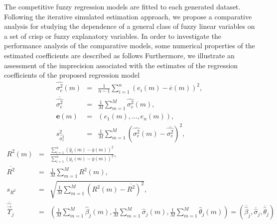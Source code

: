 \documentclass{IJFS}
\begin{document}
The competitive fuzzy regression models are fitted to each generated dataset.
Following the iterative simulated estimation approach,
we propose a comparative analysis for studying the dependence of a general class of fuzzy linear variables on a set of crisp or fuzzy explanatory variables.
In order to investigate
the performance analysis of the comparative models, some
numerical properties of the estimated coefficients are described as follows
Furthermore, we illustrate an assessment of the imprecision associated with the estimates of the regression coefficients of the proposed regression model
\begin{eqnarray*}
\widehat{\sigma^2_e}(m) &=&\frac{1}{n-1}\sum_{i=1}^{n}(e_i(m)-\overline{e}(m))^2, \\
\overline{\widehat{\sigma^2_e}}&=&\frac{1}{M} \sum_{m=1}^M  \widehat{\sigma^2_e}(m),\\
\boldsymbol{e}(m)&=&(e_1(m),\ldots,e_n(m)),\\
s^2_{\widehat{\sigma^2_e}}&=&\frac{1}{M} \sum_{m=1}^M (\widehat{\sigma^2_e}(m)-\overline{\widehat{\sigma^2_e}})^2,
\end{eqnarray*}
\begin{eqnarray*}
R^2(m)&=&\frac{\sum_{i=1}^{n}(\widehat{y}_i(m)-\overline{y}(m))^2}{\sum_{i=1}^{n}(y_i(m)-\overline{y}(m))^2}, \\
\overline{R^2}&=&\frac{1}{M} \sum_{m=1}^M  R^2(m),\\
s_{R^2}  &=&\sqrt{\frac{1}{M} \sum_{m=1}^M  \left(R^2(m)-\overline{R^2}\right)^2},\\
\overline{\widehat{\vec{\Upsilon}}}_j &=&\left(\frac{1}{M}\sum_{m=1}^M\widehat{\beta}_j(m),\frac{1}{M}\sum_{m=1}^M\widehat{\sigma}_j(m),\frac{1}{M}\sum_{m=1}^M\widehat{\theta}_j(m)\right)
=\left(\overline{\widehat{\beta}}_j,\overline{\widehat{\sigma}}_j,\overline{\widehat{\theta}}_j\right)
\end{eqnarray*}
\end{document}

